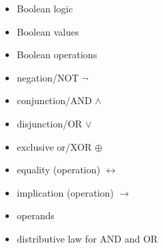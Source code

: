 \documentclass{article}
\begin{document}
\bigskip \indent
\begin{itemize}
\item Boolean logic

\item Boolean values

\item Boolean operations

\item negation/NOT $\neg$

\item conjunction/AND $\wedge$

\item disjunction/OR $\vee$

\item exclusive or/XOR $\oplus$

\item equality (operation) $\leftrightarrow$

\item implication (operation) $\rightarrow$

\item operands

\item distributive law for AND and OR

\end{itemize}
\end{document}
